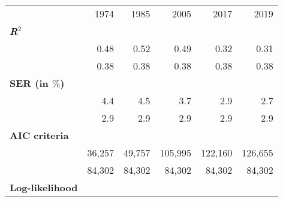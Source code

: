 
\begin{tabular}{llllll}
\cline{1-6}
\multicolumn{1}{c}{} &
  \multicolumn{1}{|r}{1974} &
  \multicolumn{1}{r}{1985} &
  \multicolumn{1}{r}{2005} &
  \multicolumn{1}{r}{2017} &
  \multicolumn{1}{r}{2019} \\
\cline{1-6}
\multicolumn{1}{l}{\textbf{\textit{R}$^2$}} &
  \multicolumn{1}{|r}{} &
  \multicolumn{1}{r}{} &
  \multicolumn{1}{r}{} &
  \multicolumn{1}{r}{} &
  \multicolumn{1}{r}{} \\
\multicolumn{1}{l}{\hspace{1em}{Model (A)}} &
  \multicolumn{1}{|r}{0.48} &
  \multicolumn{1}{r}{0.52} &
  \multicolumn{1}{r}{0.49} &
  \multicolumn{1}{r}{0.32} &
  \multicolumn{1}{r}{0.31} \\
\multicolumn{1}{l}{\hspace{1em}{Model (B)}} &
  \multicolumn{1}{|r}{0.38} &
  \multicolumn{1}{r}{0.38} &
  \multicolumn{1}{r}{0.38} &
  \multicolumn{1}{r}{0.38} &
  \multicolumn{1}{r}{0.38} \\
\multicolumn{1}{l}{\textbf{SER (in $\%$)}} &
  \multicolumn{1}{|r}{} &
  \multicolumn{1}{r}{} &
  \multicolumn{1}{r}{} &
  \multicolumn{1}{r}{} &
  \multicolumn{1}{r}{} \\
\multicolumn{1}{l}{\hspace{1em}{Model (A)}} &
  \multicolumn{1}{|r}{4.4} &
  \multicolumn{1}{r}{4.5} &
  \multicolumn{1}{r}{3.7} &
  \multicolumn{1}{r}{2.9} &
  \multicolumn{1}{r}{2.7} \\
\multicolumn{1}{l}{\hspace{1em}{Model (B)}} &
  \multicolumn{1}{|r}{2.9} &
  \multicolumn{1}{r}{2.9} &
  \multicolumn{1}{r}{2.9} &
  \multicolumn{1}{r}{2.9} &
  \multicolumn{1}{r}{2.9} \\
\multicolumn{1}{l}{\textbf{AIC criteria}} &
  \multicolumn{1}{|r}{} &
  \multicolumn{1}{r}{} &
  \multicolumn{1}{r}{} &
  \multicolumn{1}{r}{} &
  \multicolumn{1}{r}{} \\
\multicolumn{1}{l}{\hspace{1em}{Model (A)}} &
  \multicolumn{1}{|r}{36,257} &
  \multicolumn{1}{r}{49,757} &
  \multicolumn{1}{r}{105,995} &
  \multicolumn{1}{r}{122,160} &
  \multicolumn{1}{r}{126,655} \\
\multicolumn{1}{l}{\hspace{1em}{Model (B)}} &
  \multicolumn{1}{|r}{84,302} &
  \multicolumn{1}{r}{84,302} &
  \multicolumn{1}{r}{84,302} &
  \multicolumn{1}{r}{84,302} &
  \multicolumn{1}{r}{84,302} \\
\multicolumn{1}{l}{\textbf{Log-likelihood}} &

\end{tabular}
